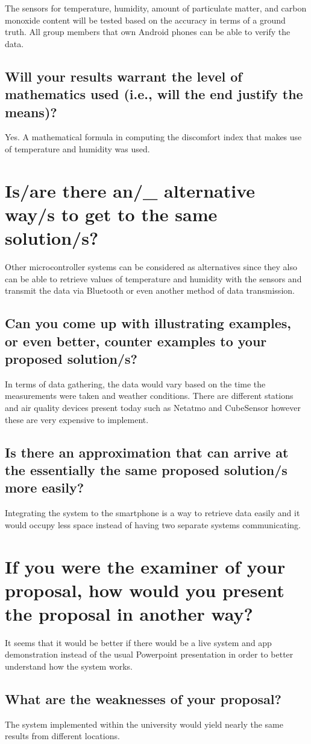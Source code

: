 The sensors for temperature, humidity, amount of particulate matter, and carbon monoxide content will be tested based on the accuracy in terms of a ground truth. All group members that own Android phones can be able to verify the data.
			
\subsection{Will your results warrant the level of mathematics used (i.e., will the end justify the means)?}
	    
Yes. A mathematical formula in computing the discomfort index that makes use of temperature and humidity was used.
			

\section{Is/are there an/\_ alternative way/s to get to the same solution/s?}

Other microcontroller systems can be considered as alternatives since they also can be able to retrieve values of temperature and humidity with the sensors and transmit the data via Bluetooth or even another method of data transmission.
	
\subsection{Can you come up with illustrating examples, or even better, counter examples to your proposed solution/s?}

In terms of data gathering, the data would vary based on the time the measurements were taken and weather conditions. There are different stations and air quality devices present today such as Netatmo and CubeSensor however these are very expensive to implement.
	
\subsection{Is there an approximation that can arrive at the essentially the same proposed solution/s more easily?}
	
Integrating the system to the smartphone is a way to retrieve data easily and it would occupy less space instead of having two separate systems communicating.
	
	
\section{If you were the examiner of your proposal, how would you present the proposal in another way?}
	
It seems that it would be better if there would be a live system and app demonstration instead of the usual Powerpoint presentation in order to better understand how the system works.
	
\subsection{What are the weaknesses of your proposal?}

The system implemented within the university would yield nearly the same results from different locations.
